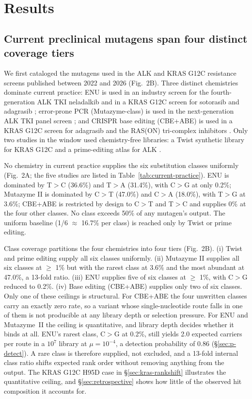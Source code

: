 \documentclass[11pt,a4paper]{article}
\begin{document}
\section{Results}

\subsection{Current preclinical mutagens span four distinct coverage tiers}

We first cataloged the mutagens used in the ALK and KRAS G12C
resistance screens published between 2022 and 2026 (Fig.~2B).
Three distinct chemistries dominate current practice: ENU is used in
an industry screen for the fourth-generation ALK TKI neladalkib
\citep{tangpeerachaikul2025} and in a KRAS G12C screen for sotorasib
and adagrasib \citep{koga2021}; error-prone PCR (Mutazyme-class) is used
in the next-generation ALK TKI panel screen \citep{takei2025}; and
CRISPR base editing (CBE+ABE) is used in a KRAS G12C screen for
adagrasib and the RAS(ON) tri-complex inhibitors \citep{diaz2025}. Only
two studies in the window used chemistry-free libraries: a Twist
synthetic library for KRAS G12C \citep{feng2022} and a prime-editing
atlas for ALK \citep{oh2026}.

No chemistry in current practice supplies the six substitution classes
uniformly (Fig.~2A; the five studies are listed in
Table~\ref{tab:current-practice}). ENU is dominated by T$>$C (36.6\%)
and T$>$A (31.4\%), with C$>$G at only 0.2\%; Mutazyme II is dominated
by C$>$T (47.0\%) and C$>$A (18.0\%), with T$>$G at 3.6\%; CBE+ABE is
restricted by design to C$>$T and T$>$C and supplies 0\% at the four
other classes. No class exceeds 50\% of any mutagen's output. The uniform
baseline (1/6 $\approx$ 16.7\% per class) is reached only by Twist or
prime editing.

Class coverage partitions the four chemistries into four tiers
(Fig.~2B). (i) Twist and prime editing supply all six classes uniformly.
(ii) Mutazyme II supplies all six classes at $\geq$ 1\% but with the rarest
class at 3.6\% and the most abundant at 47.0\%, a 13-fold ratio. (iii) ENU
supplies five of six classes at $\geq$ 1\%, with C$>$G reduced to 0.2\%.
(iv) Base editing (CBE+ABE) supplies only two of six classes.
Only one of these ceilings is structural. For CBE+ABE the four
unwritten classes carry an exactly zero rate, so a variant whose
single-nucleotide route falls in one of them is not producible at any
library depth or selection pressure. For ENU and Mutazyme~II the
ceiling is quantitative, and library depth decides whether it binds at
all. ENU's rarest class, C$>$G at 0.2\%, still yields 2.0 expected
carriers per route in a $10^7$ library at $\mu = 10^{-4}$, a detection
probability of 0.86 (\S\ref{sec:p-detect}). A rare class is therefore
supplied, not excluded, and a 13-fold internal class ratio shifts
expected rank order without removing anything from the output. The
KRAS G12C H95D case in \S\ref{sec:kras-rankshift} illustrates the
quantitative ceiling, and \S\ref{sec:retrospective} shows how little
of the observed hit composition it accounts for.
\end{document}

